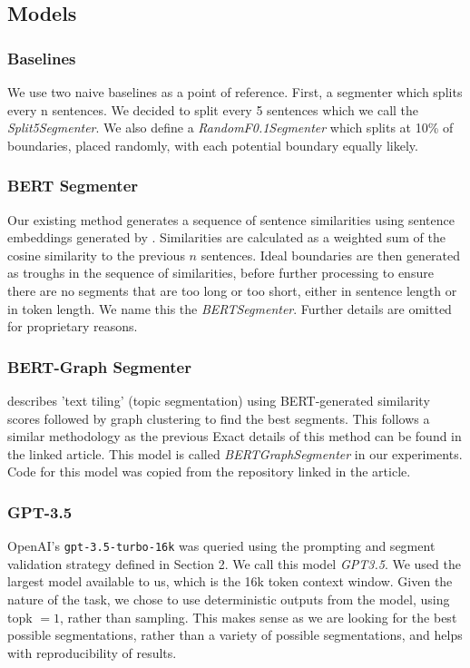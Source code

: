 \subsection{Models}

\subsubsection{Baselines}

We use two naive baselines as a point of reference. First, a segmenter which splits every n sentences. We decided to split every 5 sentences which we call the \emph{Split5Segmenter}. We also define a \emph{RandomF0.1Segmenter} which splits at 10\% of boundaries, placed randomly, with each potential boundary equally likely.

\subsubsection{BERT Segmenter}

Our existing method generates a sequence of sentence similarities using sentence embeddings generated by \cite{SentenceBERT}. Similarities are calculated as a weighted sum of the cosine similarity to the previous $n$ sentences. Ideal boundaries are then generated as troughs in the sequence of similarities, before further processing to ensure there are no segments that are too long or too short, either in sentence length or in token length. We name this the \emph{BERTSegmenter}. Further details are omitted for proprietary reasons.

\subsubsection{BERT-Graph Segmenter}

\cite{MasimilianoSegmenter} describes 'text tiling' (topic segmentation) using BERT-generated similarity scores followed by graph clustering to find the best segments. This follows a similar methodology as the previous Exact details of this method can be found in the linked article. This model is called \emph{BERTGraphSegmenter} in our experiments. Code for this model was copied from the repository linked in the article.

\subsubsection{GPT-3.5}

OpenAI's \texttt{gpt-3.5-turbo-16k} was queried using the prompting and segment validation strategy defined in Section 2. We call this model \emph{GPT3.5}. We used the largest model available to us, which is the 16k token context window. Given the nature of the task, we chose to use deterministic outputs from the model, using topk $=1$, rather than sampling. This makes sense as we are looking for the best possible segmentations, rather than a variety of possible segmentations, and helps with reproducibility of results.

